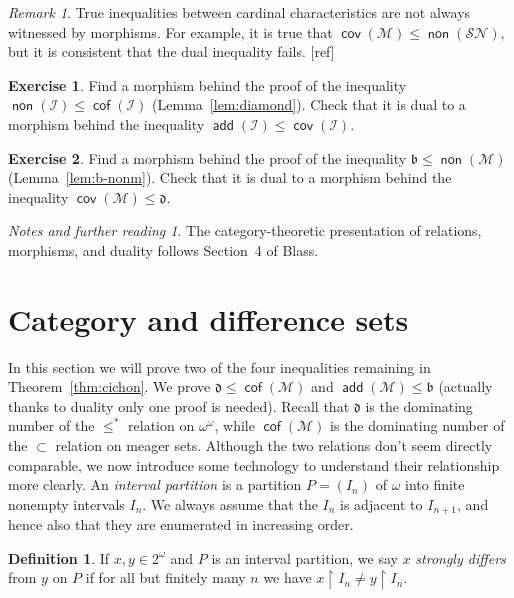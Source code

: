 \documentclass[11pt,oneside]{amsbook}
\newcommand{\Meager}{\mathcal M}
\DeclareMathOperator{\add}{\mathsf{add}}
\DeclareMathOperator{\non}{\mathsf{non}}
\DeclareMathOperator{\cov}{\mathsf{cov}}
\DeclareMathOperator{\cof}{\mathsf{cof}}
\theoremstyle{definition}
\newtheorem{exerc}{Exercise}[section]
\theoremstyle{plain}
\theoremstyle{definition}
\newtheorem{defn}[thm]{Definition}
\theoremstyle{remark}
\newtheorem{rem}[thm]{Remark}
\newtheorem*{notes}{Notes and further reading}
\begin{document}
\begin{rem}
  True inequalities between cardinal characteristics are not always witnessed by morphisms. For example, it is true that $\cov(\Meager)\leq\non(\mathcal{SN})$, but it is consistent that the dual inequality fails. [ref]
\end{rem}

\begin{exerc}
  Find a morphism behind the proof of the inequality $\non(\mathcal I)\leq\cof(\mathcal I)$ (Lemma~\ref{lem:diamond}). Check that it is dual to a morphism behind the inequality $\add(\mathcal I)\leq\cov(\mathcal I)$.
\end{exerc}

\begin{exerc}
  Find a morphism behind the proof of the inequality $\mathfrak b\leq\non(\Meager)$ (Lemma~\ref{lem:b-nonm}). Check that it is dual to a morphism behind the inequality $\cov(\Meager)\leq\mathfrak d$.
\end{exerc}

\begin{notes}
  The category-theoretic presentation of relations, morphisms, and duality follows Section~4 of Blass.
\end{notes}


\section{Category and difference sets}

In this section we will prove two of the four inequalities remaining in Theorem~\ref{thm:cichon}. We prove $\mathfrak d\leq\cof(\Meager)$ and $\add(\Meager)\leq\mathfrak b$ (actually thanks to duality only one proof is needed). Recall that $\mathfrak d$ is the dominating number of the $\leq^*$ relation on $\omega^\omega$, while $\cof(\Meager)$ is the dominating number of the $\subset$ relation on meager sets. Although the two relations don't seem directly comparable, we now introduce some technology to understand their relationship more clearly. An \emph{interval partition} is a partition $P=(I_n)$ of $\omega$ into finite nonempty intervals $I_n$. We always assume that the $I_n$ is adjacent to $I_{n+1}$, and hence also that they are enumerated in increasing order.

\begin{defn}
  If $x,y\in2^\omega$ and $P$ is an interval partition, we say $x$ \emph{strongly differs} from $y$ on $P$ if for all but finitely many $n$ we have $x\restriction I_n\neq y\restriction I_n$.
\end{defn}
\end{document}
